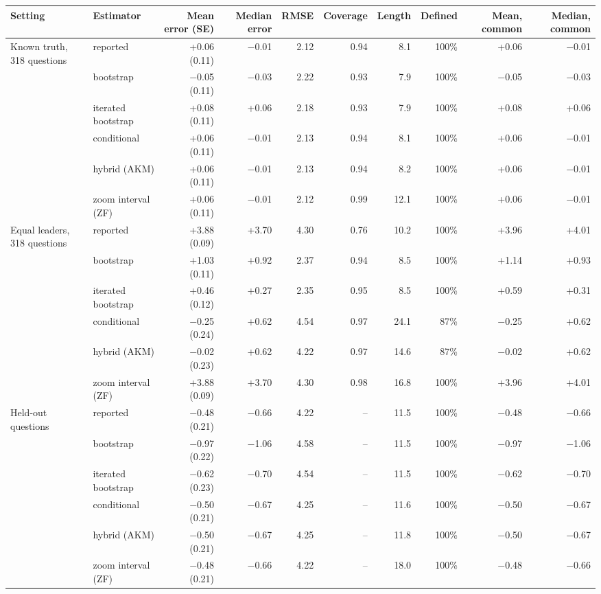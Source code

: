 \begin{tabular}{llrrrrrrrr}
\toprule
Setting & Estimator & Mean error (SE) & Median error & RMSE & Coverage & Length & Defined & Mean, common & Median, common \\
\midrule
Known truth, 318 questions & reported & +0.06 (0.11) & $-$0.01 & 2.12 & 0.94 & 8.1 & 100\% & +0.06 & $-$0.01 \\
 & bootstrap & $-$0.05 (0.11) & $-$0.03 & 2.22 & 0.93 & 7.9 & 100\% & $-$0.05 & $-$0.03 \\
 & iterated bootstrap & +0.08 (0.11) & +0.06 & 2.18 & 0.93 & 7.9 & 100\% & +0.08 & +0.06 \\
 & conditional & +0.06 (0.11) & $-$0.01 & 2.13 & 0.94 & 8.1 & 100\% & +0.06 & $-$0.01 \\
 & hybrid (AKM) & +0.06 (0.11) & $-$0.01 & 2.13 & 0.94 & 8.2 & 100\% & +0.06 & $-$0.01 \\
 & zoom interval (ZF) & +0.06 (0.11) & $-$0.01 & 2.12 & 0.99 & 12.1 & 100\% & +0.06 & $-$0.01 \\
\addlinespace
Equal leaders, 318 questions & reported & +3.88 (0.09) & +3.70 & 4.30 & 0.76 & 10.2 & 100\% & +3.96 & +4.01 \\
 & bootstrap & +1.03 (0.11) & +0.92 & 2.37 & 0.94 & 8.5 & 100\% & +1.14 & +0.93 \\
 & iterated bootstrap & +0.46 (0.12) & +0.27 & 2.35 & 0.95 & 8.5 & 100\% & +0.59 & +0.31 \\
 & conditional & $-$0.25 (0.24) & +0.62 & 4.54 & 0.97 & 24.1 & 87\% & $-$0.25 & +0.62 \\
 & hybrid (AKM) & $-$0.02 (0.23) & +0.62 & 4.22 & 0.97 & 14.6 & 87\% & $-$0.02 & +0.62 \\
 & zoom interval (ZF) & +3.88 (0.09) & +3.70 & 4.30 & 0.98 & 16.8 & 100\% & +3.96 & +4.01 \\
\addlinespace
Held-out questions & reported & $-$0.48 (0.21) & $-$0.66 & 4.22 & -- & 11.5 & 100\% & $-$0.48 & $-$0.66 \\
 & bootstrap & $-$0.97 (0.22) & $-$1.06 & 4.58 & -- & 11.5 & 100\% & $-$0.97 & $-$1.06 \\
 & iterated bootstrap & $-$0.62 (0.23) & $-$0.70 & 4.54 & -- & 11.5 & 100\% & $-$0.62 & $-$0.70 \\
 & conditional & $-$0.50 (0.21) & $-$0.67 & 4.25 & -- & 11.6 & 100\% & $-$0.50 & $-$0.67 \\
 & hybrid (AKM) & $-$0.50 (0.21) & $-$0.67 & 4.25 & -- & 11.8 & 100\% & $-$0.50 & $-$0.67 \\
 & zoom interval (ZF) & $-$0.48 (0.21) & $-$0.66 & 4.22 & -- & 18.0 & 100\% & $-$0.48 & $-$0.66 \\
\bottomrule
\end{tabular}
